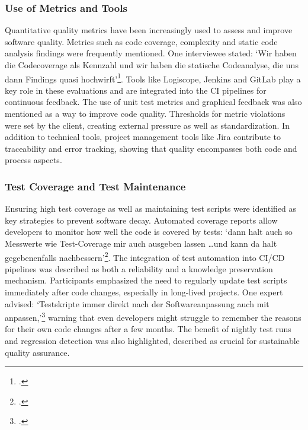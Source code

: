 \subsubsection{Use of Metrics and Tools}
Quantitative quality metrics have been increasingly used to assess and improve software quality. Metrics such as code coverage, complexity and static code analysis findings were frequently mentioned. One interviewee stated: `Wir haben die Codecoverage als Kennzahl und wir haben die statische Codeanalyse,
die uns dann Findings quasi hochwirft'\footcite{Interview32025}. Tools like Logiscope, Jenkins and GitLab play a key role in these evaluations and are integrated into the CI pipelines for continuous feedback.
The use of unit test metrics and graphical feedback was also mentioned as a way to improve code quality. Thresholds for metric violations were set by the client, creating external pressure as well as standardization. In addition to technical tools, project management tools like Jira contribute to traceability and error tracking,
showing that quality encompasses both code and process aspects.

\subsubsection{Test Coverage and Test Maintenance}
Ensuring high test coverage as well as maintaining test scripts were identified as key strategies to prevent software decay. Automated coverage reports allow developers to monitor how well the code is covered by tests: `dann halt auch so Messwerte wie Test-Coverage mir auch ausgeben lassen \ldots und kann da halt gegebenenfalls nachbessern'\footcite{Interview32025}.
The integration of test automation into CI/CD pipelines was described as both a reliability and a knowledge preservation mechanism.
Participants emphasized the need to regularly update test scripts immediately after code changes, especially in long-lived projects. One expert advised: `Testskripte immer direkt nach der Softwareanpassung auch mit anpassen,'\footcite{Interview12025} warning that even developers might struggle to remember the reasons for their own code changes after a few months.
The benefit of nightly test runs and regression detection was also highlighted, described as crucial for sustainable quality assurance.

